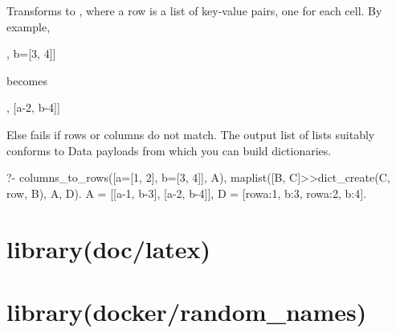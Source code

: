 \begin{description}
Transforms  to , where a row is a list of
key-value pairs, one for each cell. By example,

\begin{code}
[a=[1, 2], b=[3, 4]]
\end{code}

becomes

\begin{code}
[[a-1, b-3], [a-2, b-4]]
\end{code}

Else fails if rows or columns do not match. The output list of lists
suitably conforms to  Data payloads from which you can
build dictionaries.

\begin{code}
?- columns_to_rows([a=[1, 2], b=[3, 4]], A),
   maplist([B, C]>>dict_create(C, row, B), A, D).
A = [[a-1, b-3], [a-2, b-4]],
D = [row{a:1, b:3}, row{a:2, b:4}].
\end{code}

\end{description}

\chapter{library(doc/latex)}\label{sec:latex}

\begin{description}
\end{description}

\chapter{library(docker/random_names)}\label{sec:randomnames}

